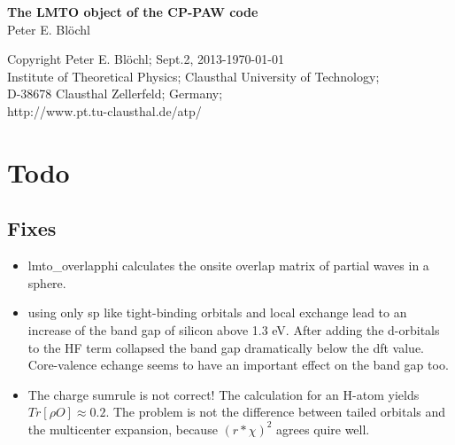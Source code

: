 \documentclass[11pt,a4paper]{report}
\begin{document}
\begin{titlepage}
\begin{center}
\vspace*{3.5cm}
{\huge \textbf{The LMTO object of the CP-PAW code}}\\
\vspace{0.5cm}
{\large Peter E. Bl\"ochl}
\vspace{0.5cm} 
\end{center}

\vfill
\begin{center}
Copyright Peter E. Bl\"ochl; Sept.2, 2013-\today\\
{\small
Institute of Theoretical Physics;
Clausthal University of Technology;\\ 
D-38678 Clausthal Zellerfeld; Germany;\\
http://www.pt.tu-clausthal.de/atp/}
\end{center}
\end{titlepage}
\noindent            
\tableofcontents
\chapter{Todo}
\section{Fixes}
\begin{itemize}
\item lmto\_overlapphi calculates the onsite overlap matrix of partial
  waves in a sphere.
%
\item using only sp like tight-binding orbitals and local exchange
  lead to an increase of the band gap of silicon above 1.3 eV. After
  adding the d-orbitals to the HF term collapsed the band gap
  dramatically below the dft value. Core-valence echange seems to have
  an important effect on the band gap too.
%

%
\item The charge sumrule is not correct! The calculation for an H-atom
  yields $Tr[\rho O]\approx 0.2$. The problem is not the difference
  between tailed orbitals and the multicenter expansion, because
  $(r*\chi)^2$ agrees quire well.
%
\end{itemize}
\end{document}
